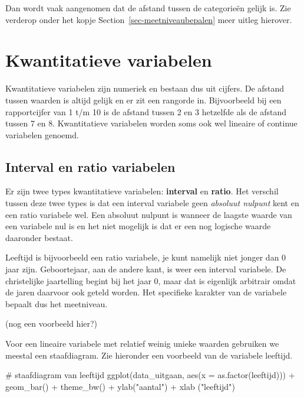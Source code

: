 \documentclass[
  letterpaper,
  DIV=11,
  numbers=noendperiod]{scrreprt}
\newenvironment{Shaded}{\begin{snugshade}}{\end{snugshade}}
\newcommand{\AttributeTok}[1]{\textcolor[rgb]{0.40,0.45,0.13}{#1}}
\newcommand{\CommentTok}[1]{\textcolor[rgb]{0.37,0.37,0.37}{#1}}
\newcommand{\FunctionTok}[1]{\textcolor[rgb]{0.28,0.35,0.67}{#1}}
\newcommand{\NormalTok}[1]{\textcolor[rgb]{0.00,0.23,0.31}{#1}}
\newcommand{\SpecialCharTok}[1]{\textcolor[rgb]{0.37,0.37,0.37}{#1}}
\newcommand{\StringTok}[1]{\textcolor[rgb]{0.13,0.47,0.30}{#1}}
\begin{document}
Dan wordt vaak aangenomen dat de afstand tussen de categorieën gelijk
is. Zie verderop onder het kopje Section~\ref{sec-meetniveaubepalen}
meer uitleg hierover.

\section{Kwantitatieve variabelen}\label{kwantitatieve-variabelen}

Kwantitatieve variabelen zijn numeriek en bestaan dus uit cijfers. De
afstand tussen waarden is altijd gelijk en er zit een rangorde in.
Bijvoorbeeld bij een rapportcijfer van 1 t/m 10 is de afstand tussen 2
en 3 hetzelfde als de afstand tussen 7 en 8. Kwantitatieve variabelen
worden soms ook wel lineaire of continue variabelen genoemd.

\subsection{Interval en ratio variabelen}\label{sec-intervalratio}

Er zijn twee types kwantitatieve variabelen: \textbf{interval} en
\textbf{ratio}. Het verschil tussen deze twee types is dat een interval
variabele geen \emph{absoluut nulpunt} kent en een ratio variabele wel.
Een absoluut nulpunt is wanneer de laagste waarde van een variabele nul
is en het niet mogelijk is dat er een nog logische waarde daaronder
bestaat.

Leeftijd is bijvoorbeeld een ratio variabele, je kunt namelijk niet
jonger dan 0 jaar zijn. Geboortejaar, aan de andere kant, is weer een
interval variabele. De christelijke jaartelling begint bij het jaar 0,
maar dat is eigenlijk arbitrair omdat de jaren daarvoor ook geteld
worden. Het specifieke karakter van de variabele bepaalt dus het
meetniveau.

(nog een voorbeeld hier?)

Voor een lineaire variabele met relatief weinig unieke waarden gebruiken
we meestal een staafdiagram. Zie hieronder een voorbeeld van de
variabele leeftijd.

\begin{Shaded}
\begin{Highlighting}[]
\CommentTok{\# staafdiagram van leeftijd}
\FunctionTok{ggplot}\NormalTok{(data\_uitgaan, }\FunctionTok{aes}\NormalTok{(}\AttributeTok{x =} \FunctionTok{as.factor}\NormalTok{(leeftijd))) }\SpecialCharTok{+}
  \FunctionTok{geom\_bar}\NormalTok{() }\SpecialCharTok{+}
  \FunctionTok{theme\_bw}\NormalTok{() }\SpecialCharTok{+} 
  \FunctionTok{ylab}\NormalTok{(}\StringTok{"aantal"}\NormalTok{) }\SpecialCharTok{+}
  \FunctionTok{xlab}\NormalTok{ (}\StringTok{"leeftijd"}\NormalTok{)}
\end{Highlighting}
\end{Shaded}
\end{document}
